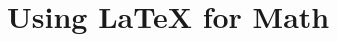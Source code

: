 \documentclass[aspectratio=169]{beamer}
\begin{document}
\section{Using \LaTeX{} for Math}

















\end{document}
